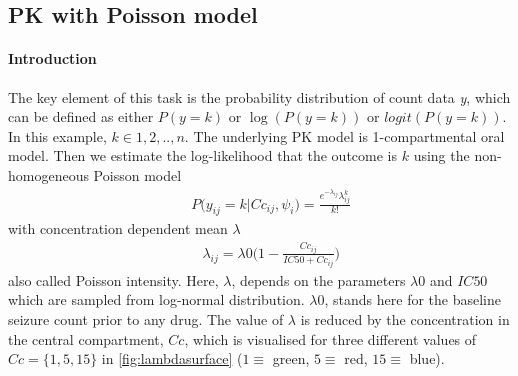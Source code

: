 \subsection{PK with Poisson model}
\label{subsec:PKPDcount}

\paragraph{Introduction}

The key element of this task is the probability distribution of count data \emph{y}, which can be defined as either $P(y=k)$ or $\log(P(y=k))$ or $logit(P(y=k))$. In this example, $k \in {1,2, .., n}$. The underlying PK model is 1-compartmental oral model. Then we estimate the log-likelihood that the outcome is $k$ using the non-homogeneous Poisson model 
\begin{eqnarray}
&& P\big(y_{ij}=k | Cc_{ij}, \psi_i\big) =  \frac{e^{-\lambda_{ij}} \lambda^k_{ij}}{k!} \nonumber
\end{eqnarray}
with concentration dependent mean $\lambda$
\begin{eqnarray}
&& \lambda_{ij} = \lambda0 \Big(1 - \frac{Cc_{ij}}{IC50 + Cc_{ij}}\Big)  \nonumber
\end{eqnarray}
also called Poisson intensity. Here, $\lambda$, depends on the parameters $\lambda0$ and $IC50$ which are sampled from log-normal distribution. $\lambda0$, stands here for the baseline seizure count prior to any drug. The value of $\lambda$ is reduced by the concentration in the central compartment, $Cc$, which is visualised for three different values of $Cc = \{1,5,15\}$ in \ref{fig:lambdasurface} ($1\equiv$ green, $5 \equiv$ red, $15 \equiv$ blue).

